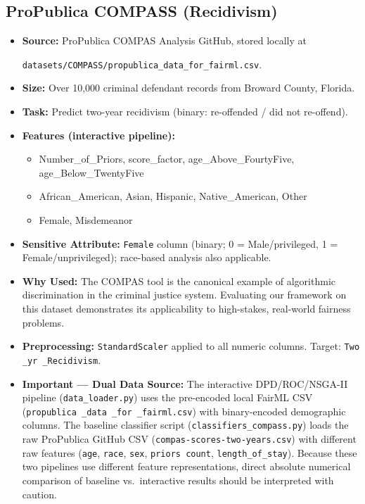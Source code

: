 \documentclass[12pt,a4paper]{article}
\begin{document}
\subsection{ProPublica COMPASS (Recidivism)}
\begin{itemize}
    \item \textbf{Source:} ProPublica COMPAS Analysis GitHub, stored locally at  
    
    \texttt{datasets/COMPASS/propublica\_data\_for\_fairml.csv}.
    
    \item \textbf{Size:} Over 10,000 criminal defendant records from Broward County, Florida.
    
    \item \textbf{Task:} Predict two-year recidivism (binary: re-offended / did not re-offend).
    
    \item \textbf{Features (interactive pipeline):} 
        \begin{itemize}
            \item Number\_of\_Priors, score\_factor, age\_Above\_FourtyFive, age\_Below\_TwentyFive
            \item African\_American, Asian, Hispanic, Native\_American, Other
            \item Female, Misdemeanor
        \end{itemize}
    \item \textbf{Sensitive Attribute:} \texttt{Female} column (binary; 0 = Male/privileged, 1 = Female/unprivileged); race-based analysis also applicable.
    
    \item \textbf{Why Used:} The COMPAS tool is the canonical example of algorithmic discrimination in the criminal justice system. Evaluating our framework on this dataset demonstrates its applicability to high-stakes, real-world fairness problems.
    
    \item \textbf{Preprocessing:} \texttt{StandardScaler} applied to all numeric columns. Target: \texttt{Two \_yr \_Recidivism}.
    
    \item \textbf{Important --- Dual Data Source:} The interactive DPD/ROC/NSGA-II pipeline (\texttt{data\_loader.py}) uses the pre-encoded local FairML CSV (\texttt{propublica \_data \_for \_fairml.csv}) with binary-encoded demographic columns. The baseline classifier script (\texttt{classifiers\_compass.py}) loads the raw ProPublica GitHub CSV (\texttt{compas-scores-two-years.csv}) with different raw features (\texttt{age}, \texttt{race}, \texttt{sex}, \texttt{priors count}, \texttt{length\_of\_stay}). Because these two pipelines use different feature representations, direct absolute numerical comparison of baseline vs.\ interactive results should be interpreted with caution.
\end{itemize}
\end{document}
